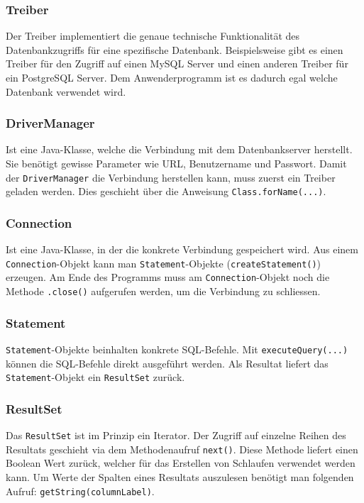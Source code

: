 \subsubsection{Treiber}
Der Treiber implementiert die genaue technische Funktionalität des Datenbankzugriffs für eine spezifische Datenbank. Beispielsweise gibt es einen Treiber für den Zugriff auf einen MySQL Server und einen anderen Treiber für ein PostgreSQL Server. Dem Anwenderprogramm ist es dadurch egal welche Datenbank verwendet wird.

\subsubsection{DriverManager}
Ist eine Java-Klasse, welche die Verbindung mit dem Datenbankserver herstellt. Sie benötigt gewisse Parameter wie URL, Benutzername und Passwort. Damit der \texttt{DriverManager} die Verbindung herstellen kann, muss zuerst ein Treiber geladen werden. Dies geschieht über die Anweisung \texttt{Class.forName(...)}.

\subsubsection{Connection}
Ist eine Java-Klasse, in der die konkrete Verbindung gespeichert wird. Aus einem \verb|Connection|-Objekt kann man \verb|Statement|-Objekte (\texttt{createStatement()}) erzeugen. Am Ende des Programms muss am \verb|Connection|-Objekt noch die Methode \verb|.close()| aufgerufen werden, um die Verbindung zu schliessen.

\subsubsection{Statement}
\verb|Statement|-Objekte beinhalten konkrete SQL-Befehle. Mit \verb|executeQuery(...)| können die SQL-Befehle direkt ausgeführt werden. Als Resultat liefert das \verb|Statement|-Objekt ein \verb|ResultSet| zurück.

\subsubsection{ResultSet}
Das \texttt{ResultSet} ist im Prinzip ein Iterator. Der Zugriff auf einzelne Reihen des Resultats geschieht via dem Methodenaufruf \verb|next()|. Diese Methode liefert einen Boolean Wert zurück, welcher für das Erstellen von Schlaufen verwendet werden kann. Um Werte der Spalten eines Resultats auszulesen benötigt man folgenden Aufruf: \verb|getString(columnLabel)|. 

